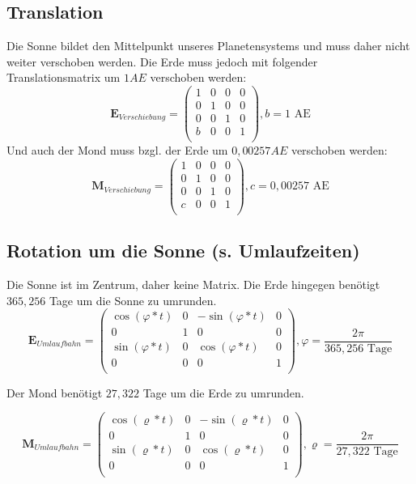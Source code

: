 \documentclass[a4paper,11pt,DIV11]{scrartcl}
\begin{document}
\subsection{Translation}
Die Sonne bildet den Mittelpunkt unseres Planetensystems und muss daher nicht weiter verschoben werden. Die Erde muss jedoch mit folgender Translationsmatrix um $1 AE$ verschoben werden: 
\begin{equation}
\bm{E}_{Verschiebung} = 
\begin{pmatrix}
1 & 0 & 0 & 0 \\
0 & 1 & 0 & 0 \\
0 & 0 & 1 & 0 \\
b & 0 & 0 & 1 \\
\end{pmatrix}
, b = 1 \text{ AE}
\end{equation}
Und auch der Mond muss bzgl. der Erde um $0,00257 AE$ verschoben werden:
\begin{equation}
\bm{M}_{Verschiebung} = 
\begin{pmatrix}
1 & 0 & 0 & 0 \\
0 & 1 & 0 & 0 \\
0 & 0 & 1 & 0 \\
c & 0 & 0 & 1 \\
\end{pmatrix}
, c = 0,00257 \text{ AE}
\end{equation}

\subsection{Rotation um die Sonne (s. Umlaufzeiten)}
Die Sonne ist im Zentrum, daher keine Matrix. Die Erde hingegen benötigt $365,256$ Tage um die Sonne zu umrunden.
\begin{equation}
\bm{E}_{Umlaufbahn} = 
\begin{pmatrix}
\cos(\varphi * t) & 0 & -\sin(\varphi * t) & 0 \\
0 & 1 & 0 & 0 \\
\sin(\varphi * t) & 0 & \cos(\varphi * t) & 0 \\
0 & 0 & 0 & 1 \\
\end{pmatrix}
, \varphi = \frac{2\pi}{365,256 \text{ Tage}}
\end{equation}

Der Mond benötigt $27,322$ Tage um die Erde zu umrunden.

\begin{equation}
\bm{M}_{Umlaufbahn} = 
\begin{pmatrix}
\cos(\varrho * t) & 0 & -\sin(\varrho * t) & 0 \\
0 & 1 & 0 & 0 \\
\sin(\varrho * t) & 0 & \cos(\varrho * t) & 0 \\
0 & 0 & 0 & 1 \\
\end{pmatrix}
, \varrho = \frac{2\pi}{27,322 \text{ Tage}}
\end{equation}
\end{document}
